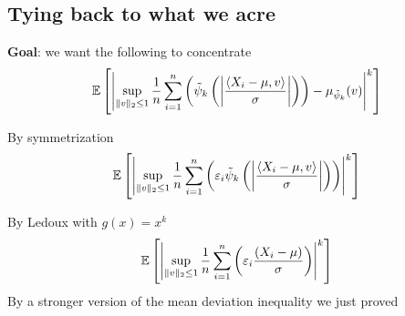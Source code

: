 \subsection{Tying back to what we acre}

\textbf{Goal}: we want the following to concentrate
\begin{align}
  \mathbb{E}\left[\left\lvert
      \sup_{\|v\|_2 \leq 1} \frac{1}{n} \sum_{i=1}^n \left(
        \tilde{\psi}_k\left(\left\lvert
            \frac{\braket{X_i - \mu, v}}{\sigma}
          \right\rvert\right)
      \right)
      - \mu_{\tilde{\psi}_k}(v)
    \right\rvert^k\right]
\end{align}

By symmetrization
\begin{align}
  \mathbb{E}\left[\left\lvert
      \sup_{\|v\|_2 \leq 1} \frac{1}{n} \sum_{i=1}^n \left(
        \varepsilon_i \tilde{\psi}_k\left(\left\lvert
            \frac{\braket{X_i - \mu, v}}{\sigma}
          \right\rvert\right)
      \right)
    \right\rvert^k\right]
\end{align}

By Ledoux with $g(x) = x^k$
\begin{align}
  \mathbb{E}\left[\left\lvert
      \sup_{\|v\|_2 \leq 1} \frac{1}{n} \sum_{i=1}^n \left(
        \varepsilon_i \frac{(X_i - \mu)}{\sigma}
      \right)
    \right\rvert^k\right]
\end{align}
By a stronger version of the mean deviation inequality we just proved
